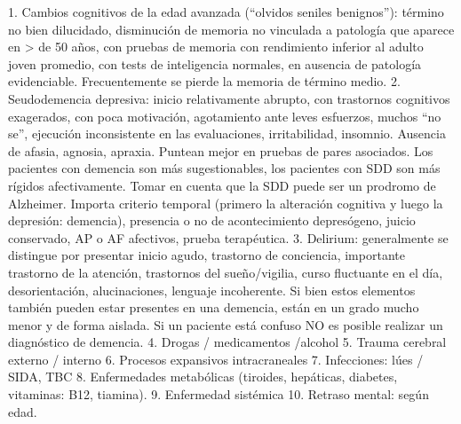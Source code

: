 1. Cambios cognitivos de la edad avanzada (“olvidos seniles benignos”): término no bien dilucidado, disminución de memoria no vinculada a patología que aparece en > de 50 años, con pruebas de memoria con rendimiento inferior al adulto joven promedio, con tests de inteligencia normales, en ausencia de patología evidenciable. Frecuentemente se pierde la memoria de término medio.
2. Seudodemencia depresiva: inicio relativamente abrupto, con trastornos cognitivos exagerados, con poca motivación, agotamiento ante leves esfuerzos, muchos “no se”, ejecución inconsistente en las evaluaciones, irritabilidad, insomnio. Ausencia de afasia, agnosia, apraxia. Puntean mejor en pruebas de pares asociados. Los pacientes con demencia son más sugestionables, los pacientes con SDD son más rígidos afectivamente. Tomar en cuenta que la SDD puede ser un prodromo de Alzheimer. Importa criterio temporal (primero la alteración cognitiva y luego la depresión: demencia), presencia o no de acontecimiento depresógeno, juicio conservado, AP o AF afectivos, prueba terapéutica.
3. Delirium: generalmente se distingue por presentar inicio agudo, trastorno de conciencia, importante trastorno de la atención, trastornos del sueño/vigilia, curso fluctuante en el día, desorientación, alucinaciones, lenguaje incoherente. Si bien estos elementos también pueden estar presentes en una demencia, están en un grado mucho menor y de forma aislada. Si un paciente está confuso NO es posible realizar un diagnóstico de demencia.
4. Drogas / medicamentos /alcohol
5. Trauma cerebral externo / interno
6. Procesos expansivos intracraneales
7. Infecciones: lúes / SIDA, TBC
8. Enfermedades metabólicas (tiroides, hepáticas, diabetes, vitaminas: B12, tiamina).
9. Enfermedad sistémica
10. Retraso mental: según edad.

